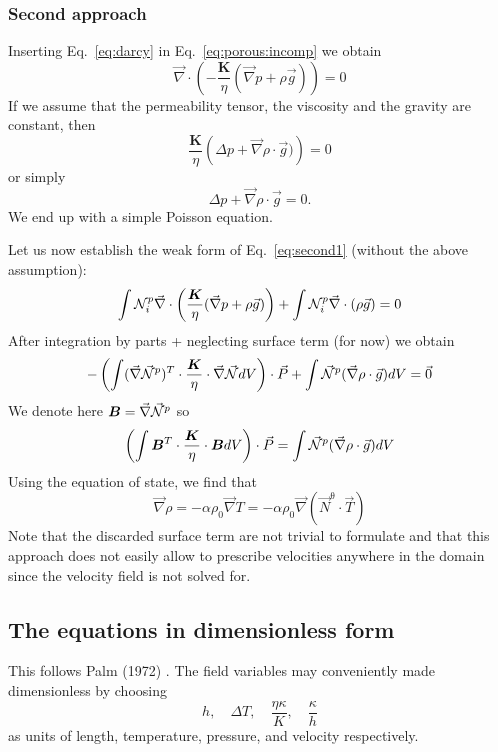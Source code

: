 \subsubsection{Second approach}



Inserting Eq.~\eqref{eq:darcy} in Eq.~\eqref{eq:porous:incomp}
we obtain
\begin{equation}
\vec\nabla \cdot 
\left( -\frac{{\bm K}}{\eta} (\vec\nabla p + \rho \vec{g}) \right) = 0
\label{eq:second1}
\end{equation}
If we assume that the permeability tensor, the viscosity and the gravity are constant, then 
\[
\frac{{\bm K}}{\eta} \left(\Delta p + \vec\nabla\rho\cdot \vec{g}) \right) = 0
\]
or simply
\[
\Delta p + \vec\nabla\rho\cdot \vec{g} = 0.
\]
We end up with a simple Poisson equation. 

Let us now establish the weak form of Eq.~\eqref{eq:second1} (without the above assumption): 
\[
\int {\mathcal{N}}_i^p \vec\nabla \cdot 
\left( \frac{{\bm K}}{\eta} (\vec\nabla p + \rho \vec{g}) \right) 
+\int {\mathcal{N}}^p_i \vec\nabla \cdot (\rho \vec{g}) = 0
\]
After integration by parts + neglecting surface term (for now) we obtain
\[
-\left( \int (\vec\nabla \vec{{\mathcal{N}}}^p)^T \cdot \frac{\bm K}{\eta} \cdot \vec\nabla \vec{{\mathcal{N}}} dV \right) \cdot \vec{P} 
+ \int \vec{{\mathcal{N}}}^p (\vec\nabla \rho \cdot \vec{g}) dV = \vec{0}
\]
We denote here ${\bm B} = \vec\nabla \vec {{\mathcal{N}}}^p$ so 
\[
\left( \int {\bm B}^T \cdot \frac{\bm K}{\eta} \cdot {\bm B} dV \right) \cdot \vec{P}
=
\int \vec{{\mathcal{N}}}^p (\vec\nabla \rho \cdot \vec{g}) dV
\]
Using the equation of state, 
we find that 
\[
\vec\nabla \rho = -\alpha \rho_0 \vec\nabla T 
= -\alpha \rho_0 \vec\nabla (\vec{N}^\uptheta \cdot \vec{T})
\]
Note that the discarded surface term are not trivial to formulate and that this approach does not easily allow to 
prescribe velocities anywhere in the domain since the velocity 
field is not solved for. 







\subsection{The equations in dimensionless form}

This follows Palm \etal (1972) \cite{pawk72}.
The field variables may conveniently made dimensionless by choosing \[
h, \quad \Delta T, \quad \frac{\eta \kappa}{K}, \quad \frac{\kappa}{h}
\]
as units of length, temperature, pressure, and velocity respectively.

